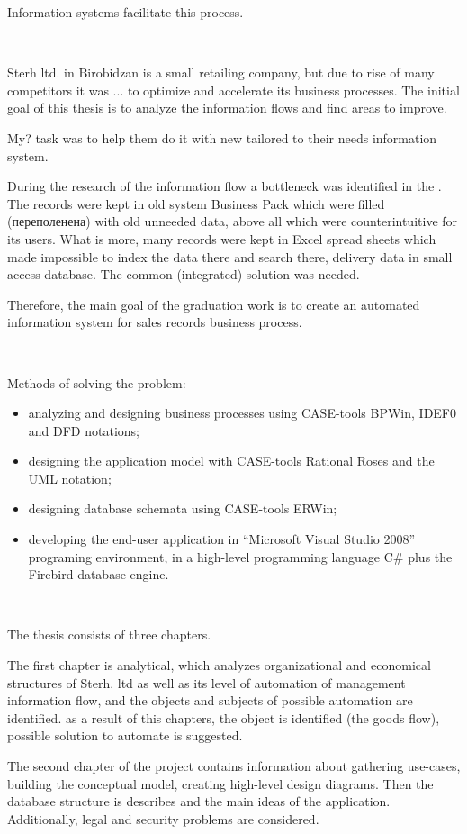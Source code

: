 \documentclass[a4paper, 12pt]{article}
\begin{document}
Information systems facilitate this process.

\

Sterh ltd. in Birobidzan is a small retailing company, but due to rise of many competitors it was ... to optimize and accelerate its business processes. The initial goal of this thesis is to analyze the information flows and find areas to improve.

My? task was to help them do it with new tailored to their needs information system.

During the research of the information flow a bottleneck was identified in the . The records were kept in old system Business Pack which were filled (переполенена) with old unneeded data, above all which were counterintuitive for its users. What is more, many records were kept in Excel spread sheets which made impossible to index the data there and search there, delivery data in small access database. The common (integrated) solution was needed.

Therefore, the main goal of the graduation work is to create an automated information system for sales records business process.

\

Methods of solving the problem:

\begin{itemize}
\item analyzing and designing business processes using CASE-tools BPWin, IDEF0 and DFD notations;
\item designing the application model with CASE-tools Rational Roses and the UML notation;
\item designing database schemata using CASE-tools ERWin;
\item developing the end-user application in ``Microsoft Visual Studio 2008'' programing environment, in a high-level programming language C\# plus the Firebird database engine.
\end{itemize}

\

The thesis consists of three chapters.

The first chapter is analytical, which analyzes organizational and economical structures of Sterh. ltd as well as its level of automation of management information flow, and the objects and subjects of possible automation are identified. as a result of this chapters, the object is identified (the goods flow), possible solution to automate is suggested.

The second chapter of the project contains information about gathering use-cases, building the conceptual model, creating high-level design diagrams. Then the database structure is describes and the main ideas of the application. Additionally, legal and security problems are considered.
\end{document}
